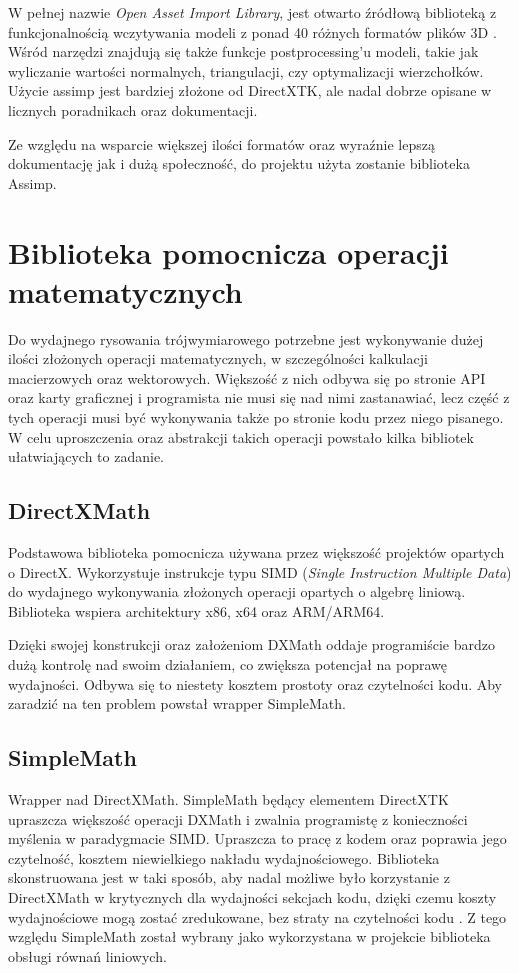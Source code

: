 W pełnej nazwie \emph{Open Asset Import Library}, jest otwarto źródłową
biblioteką z funkcjonalnością wczytywania modeli z ponad 40 różnych
formatów plików 3D \cite{github:assimp:2024}. Wśród narzędzi znajdują się także funkcje
postprocessing'u modeli, takie jak wyliczanie wartości normalnych,
triangulacji, czy optymalizacji wierzchołków. Użycie assimp jest bardziej złożone od DirectXTK, ale nadal dobrze
opisane w licznych poradnikach oraz dokumentacji.

Ze względu na wsparcie większej ilości formatów oraz wyraźnie lepszą
dokumentację jak i dużą społeczność, do projektu użyta zostanie
biblioteka Assimp.

\section{Biblioteka pomocnicza operacji matematycznych}

Do wydajnego rysowania trójwymiarowego potrzebne jest wykonywanie dużej
ilości złożonych operacji matematycznych, w szczególności kalkulacji
macierzowych oraz wektorowych. Większość z nich odbywa się po stronie
API oraz karty graficznej i programista nie musi się nad nimi
zastanawiać, lecz część z tych operacji musi być wykonywania także po
stronie kodu przez niego pisanego. W celu uproszczenia oraz abstrakcji
takich operacji powstało kilka bibliotek ułatwiających to zadanie.

\subsection{DirectXMath}

Podstawowa biblioteka pomocnicza używana przez większość projektów
opartych o DirectX. Wykorzystuje instrukcje typu SIMD (\emph{Single
Instruction Multiple Data}) do wydajnego wykonywania złożonych operacji
opartych o algebrę liniową. Biblioteka wspiera architektury x86, x64
oraz ARM/ARM64.

Dzięki swojej konstrukcji oraz założeniom DXMath oddaje programiście
bardzo dużą kontrolę nad swoim działaniem, co zwiększa potencjał na poprawę wydajności. Odbywa się to
niestety kosztem prostoty oraz czytelności kodu. Aby zaradzić na ten
problem powstał wrapper SimpleMath.

\subsection{SimpleMath}

Wrapper nad DirectXMath. SimpleMath będący elementem DirectXTK upraszcza
większość operacji DXMath i zwalnia programistę z konieczności myślenia
w paradygmacie SIMD. Upraszcza to pracę z kodem oraz poprawia jego
czytelność, kosztem niewielkiego nakładu wydajnościowego. Biblioteka
skonstruowana jest w taki sposób, aby nadal możliwe było korzystanie z
DirectXMath w krytycznych dla wydajności sekcjach kodu, dzięki czemu
koszty wydajnościowe mogą zostać zredukowane, bez straty
na czytelności kodu \cite{github:directxtk:simplemath:2024}. Z tego względu SimpleMath został wybrany
jako wykorzystana w projekcie biblioteka obsługi równań liniowych.

